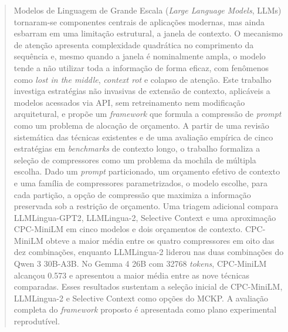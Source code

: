 \begin{abstract}

Modelos de Linguagem de Grande Escala (\textit{Large Language Models}, LLMs) tornaram-se componentes centrais de aplicações modernas, mas ainda esbarram em uma limitação estrutural, a janela de contexto. O mecanismo de atenção apresenta complexidade quadrática no comprimento da sequência e, mesmo quando a janela é nominalmente ampla, o modelo tende a não utilizar toda a informação de forma eficaz, com fenômenos como \textit{lost in the middle}, \textit{context rot} e colapso de atenção. Este trabalho investiga estratégias não invasivas de extensão de contexto, aplicáveis a modelos acessados via API, sem retreinamento nem modificação arquitetural, e propõe um \textit{framework} que formula a compressão de \textit{prompt} como um problema de alocação de orçamento. A partir de uma revisão sistemática das técnicas existentes e de uma avaliação empírica de cinco estratégias em \textit{benchmarks} de contexto longo, o trabalho formaliza a seleção de compressores como um problema da mochila de múltipla escolha. Dado um \textit{prompt} particionado, um orçamento efetivo de contexto e uma família de compressores parametrizados, o modelo escolhe, para cada partição, a opção de compressão que maximiza a informação preservada sob a restrição de orçamento. Uma triagem adicional compara LLMLingua-GPT2, LLMLingua-2, Selective Context e uma aproximação CPC-MiniLM em cinco modelos e dois orçamentos de contexto. CPC-MiniLM obteve a maior média entre os quatro compressores em oito das dez combinações, enquanto LLMLingua-2 liderou nas duas combinações do Qwen 3 30B-A3B. No Gemma 4 26B com 32768 \textit{tokens}, CPC-MiniLM alcançou 0.573 e apresentou a maior média entre as nove técnicas comparadas. Esses resultados sustentam a seleção inicial de CPC-MiniLM, LLMLingua-2 e Selective Context como opções do MCKP. A avaliação completa do \textit{framework} proposto é apresentada como plano experimental reprodutível.

\end{abstract}

